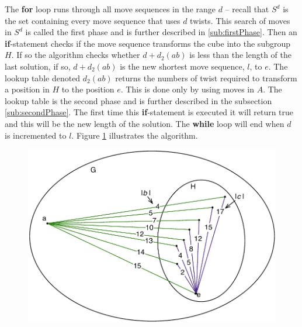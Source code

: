 The \textbf{for} loop runs through all move sequences in the range $d$ -- recall that $S^d$ is the set containing every move sequence that uses $d$ twists. This search of moves in $S^d$ is called the first phase and is further described in \ref{sub:firstPhase}.
Then an \textbf{if}-statement checks if the move sequence transforms the cube into the subgroup $H$. If so the algorithm checks whether $d + d_2(ab)$ is less than the length of the last solution, if so, $d + d_2(ab)$ is the new shortest move sequence, $l$, to $e$. 
The lookup table denoted $d_2(ab)$ returns the numbers of twist required to transform a position in $H$ to the position $e$. This is done only by using moves in $A$. %
The lookup table is the second phase and is further described in the subsection \ref{sub:secondPhase}. 
The first time this \textbf{if}-statement is executed it will return true and this will be the new length of the solution. The \textbf{while} loop will end when $d$ is incremented to $l$. Figure \ref{fig:kociemba2} illustrates the algorithm.
\begin{figure}[htb]
	\centering
		\includegraphics[scale=0.75]{input/pics/kocieambe2.pdf}
	\caption{}
	\label{fig:kociemba2}
\end{figure}

